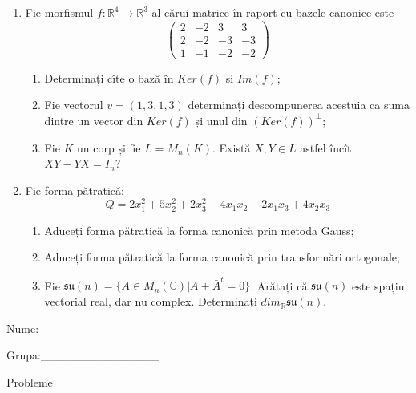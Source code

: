 \documentclass{article}
\begin{document}
\begin{enumerate}
 \item Fie morfismul $f:\mathbb{R}^4 \to \mathbb{R}^3$ al cărui matrice în raport cu bazele canonice este
$$\begin{pmatrix}
2&-2&3&3\\
2&-2&-3&-3\\
1&-1&-2&-2
\end{pmatrix}$$

\begin{enumerate}
\item Determinați cîte o bază în $Ker(f)$ și $Im(f)$;
\item Fie vectorul $v=(1,3,1,3)$ determinați descompunerea acestuia ca suma dintre un vector din $Ker(f)$ și unul din $(Ker(f))^\perp$;
\item Fie $K$ un corp și fie $L=M_n(K)$. Există $X,Y \in L$ astfel încît $XY-YX=I_n$?  
\end{enumerate}
\item Fie forma pătratică:
$$Q= 2x_1^2+5x_2^2+2x_3^2-4x_1x_2-2x_1x_3+4x_2x_3$$

\begin{enumerate}
\item Aduceți forma pătratică la forma canonică prin metoda Gauss;
\item Aduceți forma pătratică la forma canonică prin transformări ortogonale;
\item Fie $\mathfrak{su}(n)=\{ A \in M_n(\mathbb{C}) | A+\bar{A}^t=0\}$. Arătați că $\mathfrak{su}(n)$ este spațiu vectorial real, dar nu complex.
Determinați $dim_{\mathbb{R}}\mathfrak{su}(n)$.
\end{enumerate}
\end{enumerate}
\newpage
\begin{flushright}
Nume:\_\_\_\_\_\_\_\_\_\_\_\_\_\_
 
 
Grupa:\_\_\_\_\_\_\_\_\_\_\_\_\_\_
\end{flushright}
\begin{center}
\vspace{2cm}
{\Large Probleme}
\vspace{2cm}
\end{center}
\end{document}
